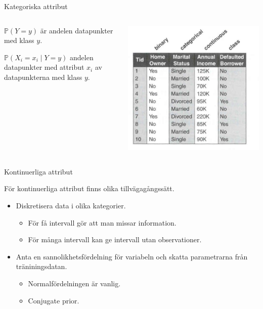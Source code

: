 \documentclass[10pt,english]{beamer}
\begin{document}
\begin{frame}{Kategoriska attribut}
    \begin{columns}
        \begin{column}{0.5\textwidth}
            $\mathbb{P}(Y = y)$ är andelen datapunkter med klass $y$.

            $\mathbb{P}(X_i = x_i \mid Y = y)$ andelen datapunkter med attribut $x_i$ av datapunkterna med klass $y$.
        \end{column}
        \begin{column}{0.5\textwidth}
            \includegraphics[width=\textwidth]{figs/data_bayes_class.png}
        \end{column}
    \end{columns}
\end{frame}

\begin{frame}{Kontinuerliga attribut}

    För kontinuerliga attribut finns olika tillvägagångssätt.

    \begin{itemize}
        \item Diskretisera data i olika kategorier.
        \begin{itemize}
            \item För få intervall gör att man missar information.
            \item För många intervall kan ge intervall utan observationer.
        \end{itemize}
        \item Anta en sannolikhetsfördelning för variabeln och skatta parametrarna från träniningsdatan.
        \begin{itemize}
            \item Normalfördelningen är vanlig.
            \item Conjugate prior.
        \end{itemize}
    \end{itemize}
    
\end{frame}
\end{document}
